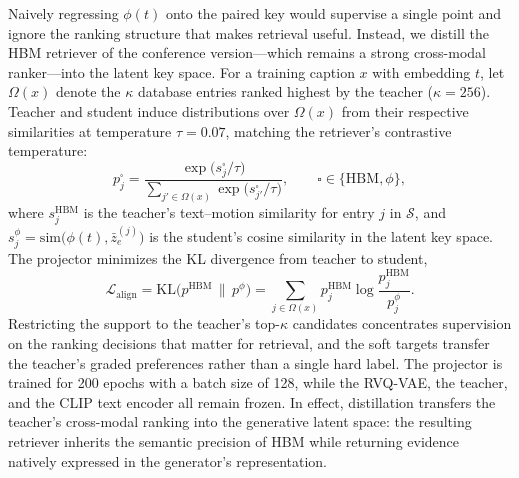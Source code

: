 \noindent {}
Naively regressing $\phi(t)$ onto the paired key would supervise a single point and ignore the ranking structure that makes retrieval useful. Instead, we distill the HBM retriever of the conference version---which remains a strong cross-modal ranker---into the latent key space.
For a training caption $x$ with embedding $t$, let $\Omega(x)$ denote the $\kappa$ database entries ranked highest by the teacher ($\kappa = 256$). Teacher and student induce distributions over $\Omega(x)$ from their respective similarities at temperature $\tau = 0.07$, matching the retriever's contrastive temperature:
\begin{equation}
p^{\square}_j
=
\frac{
    \exp\big( s^{\square}_j / \tau \big)
}{
    \sum_{j' \in \Omega(x)} \exp\big( s^{\square}_{j'} / \tau \big)
},
\qquad
\square \in \{ \mathrm{HBM}, \phi \},
\end{equation}
where $s^{\mathrm{HBM}}_j$ is the teacher's text--motion similarity for entry $j$ in $\mathcal{S}$, and $s^{\phi}_j = \mathrm{sim}\big( \phi(t), \bar{z}_e^{(j)} \big)$ is the student's cosine similarity in the latent key space. The projector minimizes the KL divergence from teacher to student,
\begin{equation}
\mathcal{L}_{\mathrm{align}}
=
\mathrm{KL}\big( p^{\mathrm{HBM}} \,\|\, p^{\phi} \big)
=
\sum_{j \in \Omega(x)}
p^{\mathrm{HBM}}_j
\log
\frac{p^{\mathrm{HBM}}_j}{p^{\phi}_j}.
\end{equation}
Restricting the support to the teacher's top-$\kappa$ candidates concentrates supervision on the ranking decisions that matter for retrieval, and the soft targets transfer the teacher's graded preferences rather than a single hard label. The projector is trained for 200 epochs with a batch size of 128, while the RVQ-VAE, the teacher, and the CLIP text encoder all remain frozen. In effect, distillation transfers the teacher's cross-modal ranking into the generative latent space: the resulting retriever inherits the semantic precision of HBM while returning evidence natively expressed in the generator's representation.

